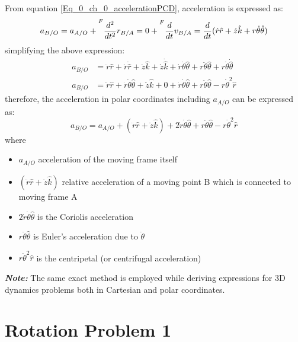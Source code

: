 From equation \eqref{Eq_0_ch_0_accelerationPCD}, acceleration is expressed as:
\begin{equation}
	a_{B/O} = a_{A/O}+ \prescript{F}{}{\frac{d^{2}}{dt^{2}}r_{B/A}} = 0 + \prescript{F}{}{\frac{d}{dt}v_{B/A}} = \frac{d}{dt}(\dot{r}\hat{r} + \dot{z}\hat{k} + r \dot{\theta} \hat{\theta})
\end{equation}
simplifying the above expression:
\begin{align*}
	a_{B/O} &= \ddot{r}\hat{r} + \dot{r}\dot{\hat{r}} + \ddot{z}\hat{k} + \dot{z}\dot{\hat{k}} + \dot{r}\dot{\theta} \hat{\theta} + r \ddot{\theta} \hat{\theta} + r \dot{\theta} \dot{\hat{\theta}} \\
	a_{B/O} &= \ddot{r}\hat{r} + \dot{r} \dot{\theta} \hat{\theta} + \ddot{z}\hat{k} + 0 + \dot{r}\dot{\theta} \hat{\theta} + r \ddot{\theta} \hat{\theta} - r \dot{\theta}^{2} \hat{r}
\end{align*}
therefore, the acceleration in polar coordinates including $a_{A/O}$ can be expressed as:
\begin{equation} \label{Eq_accelrationInPolarCoordinates}
	a_{B/O} = a_{A/O} + (\ddot{r}\hat{r} + \ddot{z}\hat{k}) + 2 \dot{r} \dot{\theta} \hat{\theta} +  r \ddot{\theta} \hat{\theta} - r \dot{\theta}^{2} \hat{r}
\end{equation}
where
\begin{itemize}
	\item $a_{A/O}$ acceleration of the moving frame itself
	\item $(\ddot{r}\hat{r} + \ddot{z}\hat{k})$ relative acceleration of a moving point B which is connected to moving frame A
	\item $2 \dot{r} \dot{\theta} \hat{\theta}$ is the Coriolis acceleration
	\item $r \ddot{\theta} \hat{\theta}$ is Euler's acceleration due to $\ddot{\theta}$
	\item $r \dot{\theta}^{2} \hat{r}$ is the centripetal (or centrifugal acceleration)
\end{itemize}

\textbf{\textit{Note: }} The same exact method is employed while deriving expressions for 3D dynamics problems both in Cartesian and polar coordinates.

\section{Rotation Problem 1}

